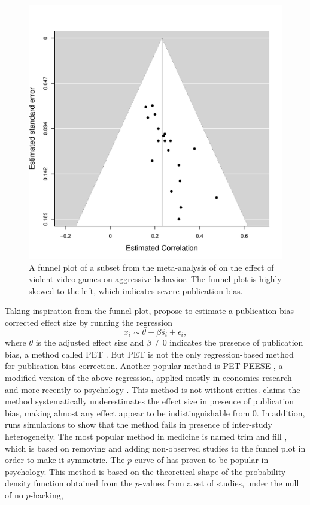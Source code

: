 \begin{figure}
\noindent \begin{centering}
\includegraphics[scale=0.5]{figures/anderson}
\par\end{centering}
\caption{\label{fig:A-funnel-plot}A funnel plot of a subset from the meta-analysis of \textcite{Anderson2010-ki} on the effect of violent video games on aggressive behavior. The funnel plot is highly skewed to the left, which indicates severe publication bias.}
\end{figure}

Taking inspiration from the funnel plot, \textcite{Egger1998-kj} propose to estimate a publication bias-corrected effect size by running the regression
\[
x_{i}\sim\theta+\beta\widehat{s}_{i}+\epsilon_{i},
\]
where $\theta$ is the adjusted effect size and $\beta\neq0$ indicates the presence of publication bias, a method called PET \parencite{stanley_beyond_2005}. But PET is not the only regression-based method for publication bias
correction. Another popular method is PET-PEESE \parencite{Stanley2014-gx}, a modified version of the above regression, applied mostly in economics research and more recently to psychology \parencite{carter_series_2015}. This method is not without critics. \textcite{gervais_putting_2015} claims the method systematically underestimates the effect size in presence of publication bias, making almost any effect appear to be indistinguishable from $0$. In addition, \textcite{simonsohn_[59]_2017} runs simulations to show that the method fails in presence of inter-study heterogeneity. The most popular method in medicine is named trim and fill \parencite{Duval2000-ct}, which is based on removing and adding non-observed studies to the funnel plot in order to make it symmetric. The $p$-curve of \textcite{simonsohn_p-curve:_2014} has proven to be popular in psychology. This method is based on the theoretical shape of the probability density function obtained from the $p$-values from a set of studies, under the null of no $p$-hacking,

